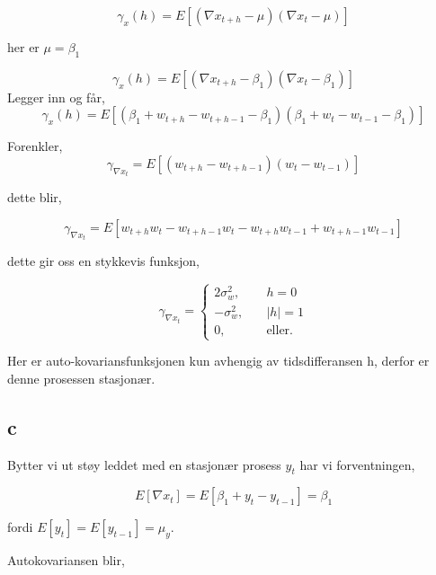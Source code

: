 \documentclass[12pt]{article}
\begin{document}
{\begin{equation*}
  \gamma_{x}(h) = E[(\nabla x_{t+h} - \mu)(\nabla x_{t} - \mu)]
\end{equation*}

her er $\mu = \beta_{1}$

\begin{equation}
  \gamma_{x}(h) = E[(\nabla x_{t+h} - \beta_{1})(\nabla x_{t} - \beta_{1})]
\end{equation}
Legger inn og får,
\begin{equation}
  \gamma_{x}(h) = E[(\beta_{1} + w_{t+h} - w_{t+h-1} - \beta_{1})(\beta_{1} + w_{t} - w_{t-1} - \beta_{1})]
\end{equation}

Forenkler,
 \begin{equation}
  \gamma_{\nabla x_{t}} = E[(w_{t+h} - w_{t+h-1})(w_{t} - w_{t-1})]
\end{equation}

dette blir,

  \begin{equation}
  \gamma_{\nabla x_{t}} = E[w_{t+h}w_{t} - w_{t+h-1}w_{t} - w_{t+h}w_{t-1} + w_{t+h-1}w_{t-1}]
\end{equation}

dette gir oss en stykkevis funksjon,

\[   
\gamma_{\nabla x_{t}} = 
   \begin{cases}
     2\sigma_{w}^2, &\quad h = 0\\
     -\sigma_{w}^2, &\quad |h| = 1 \\
     \text{0,} &\quad\text{eller.}
   \end{cases}
\]

Her er auto-kovariansfunksjonen kun avhengig av tidsdifferansen h, derfor er denne prosessen stasjonær.



\subsection{c}

Bytter vi ut støy leddet med en stasjonær prosess $y_{t}$ har vi forventningen,

\begin{equation*}
  E[\nabla x_{t}] = E[\beta_{1} + y_{t} - y_{t-1}] = \beta_{1}
\end{equation*}

fordi $E[y_{t}] = E[y_{t-1}] = \mu_{y}$.

Autokovariansen blir,

}
\end{document}
